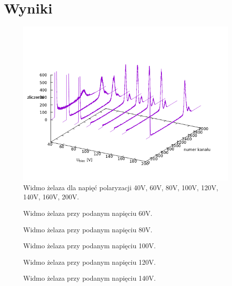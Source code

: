 \documentclass[11pt,a4paper]{article}
\begin{document}
\section{Wyniki}

\begin{figure}[H]
\centering
\includegraphics[width=.9\linewidth]{fe.png}
\caption{Widmo żelaza dla napięć polaryzacji 40V, 60V, 80V, 100V, 120V, 140V, 160V, 200V.}
\label{fig1}
\end{figure}

\begin{figure}[H]
\centering
\resizebox{.8\linewidth}{!}{}
\caption{Widmo żelaza przy podanym napięciu 60V.}
\label{fig1}
\end{figure}

\begin{figure}[H]
\centering
\resizebox{.8\linewidth}{!}{}
\caption{Widmo żelaza przy podanym napięciu 80V.}
\label{fig1}
\end{figure}

\begin{figure}[H]
\centering
\resizebox{.8\linewidth}{!}{}
\caption{Widmo żelaza przy podanym napięciu 100V.}
\label{fig1}
\end{figure}

\begin{figure}[H]
\centering
\resizebox{.8\linewidth}{!}{}
\caption{Widmo żelaza przy podanym napięciu 120V.}
\label{fig1}
\end{figure}

\begin{figure}[H]
\centering
\resizebox{.8\linewidth}{!}{}
\caption{Widmo żelaza przy podanym napięciu 140V.}
\label{fig1}
\end{figure}
\end{document}
